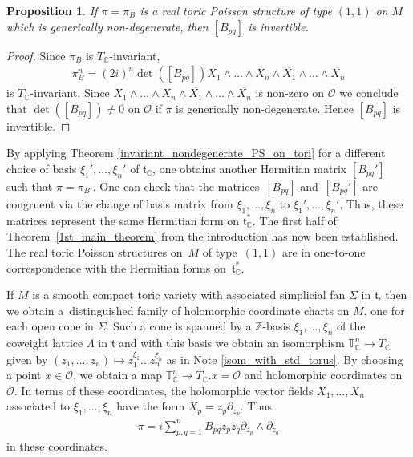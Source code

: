 \documentclass[pdftex]{sigma}
\numberwithin{equation}{section}
\newtheorem{Proposition}[Theorem]{Proposition}
 { \theoremstyle{definition}
\newtheorem{Definition}[Theorem]{Definition}
\newtheorem{Note}[Theorem]{Note}
\newtheorem{Example}[Theorem]{Example}
\newtheorem{Remark}[Theorem]{Remark} }
\begin{document}
\begin{Proposition}\label{generically_nondeg_prop}
If $\pi=\pi_B$ is a real toric Poisson structure of type $(1,1)$ on $M$ which is generically non-degenerate, then $[B_{pq}]$ is invertible.
\end{Proposition}
\begin{proof}
Since $\pi_B$ is $T_{\mathbb C}$-invariant,
\begin{gather*}
\pi_B^n=(2i)^n\det([B_{pq}])X_1\wedge\dots \wedge X_n\wedge \overline{X_1}\wedge \dots \wedge \overline{X_n}
\end{gather*}
is $T_{\mathbb C}$-invariant. Since $X_1\wedge\dots \wedge X_n\wedge \overline{X_1}\wedge \dots \wedge \overline{X_n}$ is non-zero on $\mathcal O$ we conclude that $\det([B_{pq}])\not=0$ on $\mathcal O$ if $\pi$ is generically non-degenerate. Hence $[B_{pq}]$ is invertible.
\end{proof}

\begin{Remark}
By applying Theorem \ref{invariant_nondegenerate_PS_on_tori} for a dif\/ferent choice of basis $\xi_1',\dots,\xi_n'$ of ${\mathfrak t}_{\mathbb C}$, one obtains another Hermitian matrix $[B_{pq}']$ such that $\pi=\pi_{B'}$. One can check that the matri\-ces~$[B_{pq}]$ and~$[B_{pq}']$ are congruent via the change of basis matrix from $\xi_1,\dots,\xi_n$ to $\xi_1',\dots,\xi_n'$. Thus, these matrices represent the same Hermitian form on ${\mathfrak t}_{\mathbb C}^*$. The f\/irst half of Theorem~\ref{1st_main_theorem} from the introduction has now been established. The real toric Poisson structures on~$M$ of type~$(1,1)$ are in one-to-one correspondence with the Hermitian forms on~${\mathfrak t}_{\mathbb C}^*$.
\end{Remark}

If $M$ is a smooth compact toric variety with associated simplicial fan $\Sigma$ in ${\mathfrak t}$, then we obtain a~distinguished family of holomorphic coordinate charts on $M$, one for each open cone in $\Sigma$. Such a cone is spanned by a ${\mathbb Z}$-basis $\xi_1,\dots,\xi_n$ of the coweight lattice $\Lambda$ in ${\mathfrak t}$ and with this basis we obtain an isomorphism ${\mathbb T}_{\mathbb C}^n\to T_{\mathbb C}$ given by $(z_1,\dots,z_n)\mapsto z_1^{\xi_1}\dots z_n^{\xi_n}$ as in Note \ref{isom_with_std_torus}. By choosing a point $x\in\mathcal O$, we obtain a map ${\mathbb T}_{\mathbb C}^n\to T_{\mathbb C}.x=\mathcal O$ and holomorphic coordinates on $\mathcal O$. In terms of these coordinates, the holomorphic vector f\/ields $X_1,\dots,X_n$ associated to $\xi_1,\dots,\xi_n$ have the form $X_p=z_p\partial_{z_p}$. Thus
\begin{gather}\label{pi_B_in_coordinates}
\pi=i\sum_{p,q=1}^n B_{pq} z_p\bar{z}_q \partial_{z_p}\wedge\partial_{\bar{z}_q}
\end{gather}
in these coordinates.
\end{document}
